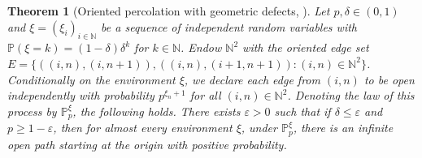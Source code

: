\documentclass[pdflatex,sn-mathphys-num]{sn-jnl}%
\newcommand{\bbN}{{\ensuremath{\mathbb N}} }
\newcommand{\bbP}{{\ensuremath{\mathbb P}} }
\newcommand{\1}{{\ensuremath{\mathbf{1}}} }
\theoremstyle{thmstyleone}%
\newtheorem{theorem}{Theorem}%
\theoremstyle{thmstyletwo}%
\theoremstyle{thmstylethree}%
\begin{document}
\begin{theorem}[Oriented percolation with geometric defects, \cite{Hilario23}]
\label{th:HSST}
Let $p,\delta\in(0,1)$ and $\xi=(\xi_i)_{i\in\bbN}$ be a sequence of independent random variables with $\bbP(\xi=k)=(1-\delta)\delta^k$ for $k\in\bbN$. Endow $\bbN^2$ with the oriented edge set $E=\{((i,n),(i,n+1)),((i,n),(i+1,n+1)):(i,n)\in\bbN^2\}$. Conditionally on the \emph{environment} $\xi$, we declare each edge from $(i,n)$ to be open independently with probability $p^{\xi_n+1}$ for all $(i,n)\in\bbN^2$. Denoting the law of this process by $\bbP_p^\xi$, the following holds. There exists $\varepsilon>0$ such that if $\delta\le \varepsilon$ and $p\ge 1-\varepsilon$, then for almost every environment $\xi$, under $\bbP_p^\xi$, there is an infinite open path starting at the origin with positive probability.
\end{theorem}
\end{document}
